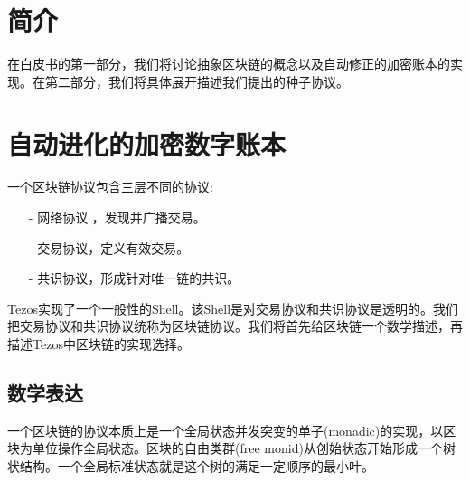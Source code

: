 \documentclass[letterpaper]{article}
\begin{document}
\tableofcontents
\newpage

\section{简介}

在白皮书的第一部分，我们将讨论抽象区块链的概念以及自动修正的加密账本的实现。在第二部分，我们将具体展开描述我们提出的种子协议。

\section{自动进化的加密数字账本}

一个区块链协议包含三层不同的协议:
\begin{itemize}
\item[-] 网络协议 ，发现并广播交易。
\item[-] 交易协议，定义有效交易。
\item[-] 共识协议，形成针对唯一链的共识。
\end{itemize}


Tezos实现了一个一般性的Shell。该Shell是对交易协议和共识协议是透明的。我们把交易协议和共识协议统称为区块链协议。我们将首先给区块链一个数学描述，再描述Tezos中区块链的实现选择。

\subsection{数学表达}

一个区块链的协议本质上是一个全局状态并发突变的单子(monadic)的实现，以区块为单位操作全局状态。区块的自由类群(free monid)从创始状态开始形成一个树状结构。一个全局标准状态就是这个树的满足一定顺序的最小叶。
\end{document}
